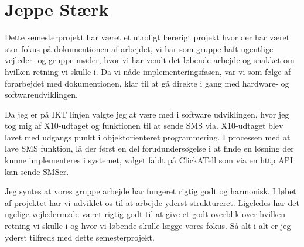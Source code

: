 \section{Jeppe Stærk}
Dette semesterprojekt har været et utroligt lærerigt projekt hvor der har været stor fokus på dokumentionen af arbejdet, vi har som gruppe haft ugentlige vejleder- og gruppe møder, hvor vi har vendt det løbende arbejde og snakket om hvilken retning vi skulle i. Da vi nåde implementeringsfasen, var vi som følge af forarbejdet med dokumentionen, klar til at gå direkte i gang med hardware- og softwareudviklingen.

Da jeg er på IKT linjen valgte jeg at være med i software udviklingen, hvor jeg tog mig af X10-udtaget og funktionen til at sende SMS via. X10-udtaget blev lavet med udgangs punkt i objektorienteret programmering. I processen med at lave SMS funktion, lå der først en del forudundersøgelse i at finde en løsning der kunne implementeres i systemet, valget faldt på ClickATell som via en http API kan sende SMSer. 

Jeg syntes at vores gruppe arbejde har fungeret rigtig godt og harmonisk. I løbet af projektet har vi udviklet os til at arbejde yderst struktureret. Ligeledes har det ugelige vejledermøde været rigtig godt til at give et godt overblik over hvilken retning vi skulle i og hvor vi løbende skulle lægge vores fokus. Så alt i alt er jeg yderst tilfreds med dette semesterprojekt.